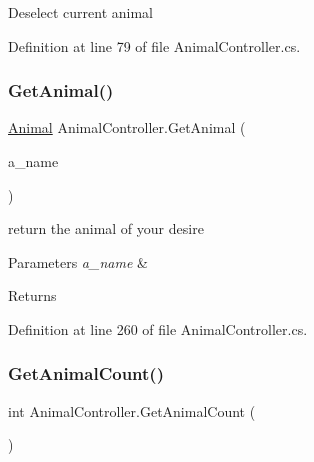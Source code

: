 Deselect current animal 



Definition at line 79 of file Animal\+Controller.\+cs.

\mbox{\label{class_animal_controller_acc148bcd2c8d45210d266f2a6ae1dcfb}} 
\subsubsection{\texorpdfstring{Get\+Animal()}{GetAnimal()}}
{\footnotesize\ttfamily \mbox{\hyperlink{class_animal}{Animal}} Animal\+Controller.\+Get\+Animal (\begin{DoxyParamCaption}\item[{\mbox{\hyperlink{_animal_8cs_a2fa5713399b84d1b88dae9196837af50}{A\+N\+I\+M\+A\+L\+\_\+\+N\+A\+ME}}}]{a\+\_\+name }\end{DoxyParamCaption})}



return the animal of your desire 


\begin{DoxyParams}{Parameters}
{\em a\+\_\+name} & \\
\hline
\end{DoxyParams}
\begin{DoxyReturn}{Returns}

\end{DoxyReturn}


Definition at line 260 of file Animal\+Controller.\+cs.

\mbox{\label{class_animal_controller_aba92998e5cc59381b205a42f53f4d875}} 
\subsubsection{\texorpdfstring{Get\+Animal\+Count()}{GetAnimalCount()}}
{\footnotesize\ttfamily int Animal\+Controller.\+Get\+Animal\+Count (\begin{DoxyParamCaption}{ }\end{DoxyParamCaption})}



